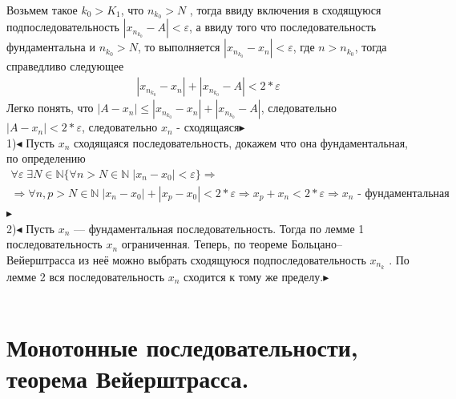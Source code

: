 \\
Возьмем такое $ k_{0}>K_1 $, что $n_{k_{0}}>N  $ , тогда ввиду включения в сходящуюся подпоследовательность $ |x_{n_{k_{0}}}-A|<\varepsilon $, а ввиду того что последовательность фундаментальна и $n_{k_{0}}>N  $, то выполняется $|x_{n_{k_{0}}}-x_n|<\varepsilon $, где $ n>n_{k_{0}}$, тогда справедливо следующее
\begin{align*}
|x_{n_{k_{0}}}-x_n|+|x_{n_{k_{0}}}-A|<2*\varepsilon
\end{align*}
Легко понять, что $ |A-x_n|\leqslant|x_{n_{k_{0}}}-x_n|+|x_{n_{k_{0}}}-A| $, следовательно $ |A-x_n|<2*\varepsilon $, следовательно $ x_n $ - сходящаяся$\blacktriangleright$\\
1)$\blacktriangleleft$ Пусть $ x_{n} $ сходящаяся последовательность, докажем что она фундаментальная, по определению
\begin{align*}
\forall \varepsilon \; \exists N \in \mathbb{N} \{\forall n> N \in \mathbb{N} \; |x_n-x_0|<\varepsilon\} \Rightarrow \\
\Rightarrow \forall n,p> N \in \mathbb{N} \; |x_n-x_0|+|x_p-x_0|<2*\varepsilon\Rightarrow
x_p+x_n<2*\varepsilon\Rightarrow x_n \text{ - фундаментальная}
\end{align*}$\blacktriangleright$
\\
2)$\blacktriangleleft$ Пусть $ x_n $ — фундаментальная последовательность. Тогда по лемме 1 последовательность
$ x_n $ ограниченная. Теперь, по теореме Больцано–Вейерштрасса из неё можно выбрать сходящуюся
подпоследовательность $ x_{n_{k}} $
. По лемме 2 вся последовательность $x_{n}$ сходится к
тому же пределу.$\blacktriangleright$
\\
\\


\section{Монотонные последовательности, теорема Вейерштрасса.}

